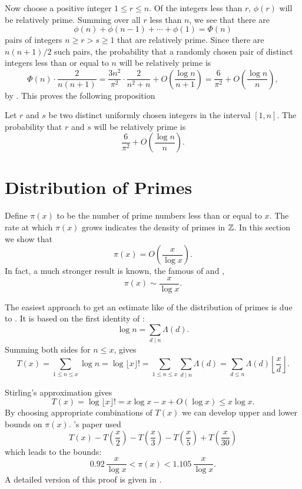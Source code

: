 Now choose a positive integer $1 \le r \le n$.  Of the integers less than
$r$, $\phi(r)$ will be relatively prime.  Summing over all $r$ less
than $n$, we see that there are 
\[
\phi(n) + \phi(n-1) + \cdots + \phi(1) = \Phi(n)
\]
pairs of integers $n \ge r > s \ge 1$ that are relatively prime.  Since
there are $n(n+1)/2$ such pairs, the probability that a randomly chosen
pair of distinct integers less than or equal to $n$ will be relatively
prime is
\[
\Phi(n) \cdot \frac{2}{n(n+1)} 
  = \frac{3 n^2}{\pi^2} \cdot \frac{2}{n^2+n} 
      + O\left(\frac{\log n}{n+1}\right)
  = \frac{6}{\pi^2}+ O\left(\frac{\log n}{n}\right),
\]
by .
This proves the following proposition
\begin{proposition}
\label{RelPrime:Pairs:Prop}
Let $r$ and $s$ be two distinct uniformly chosen integers in the
interval $[1, n]$.  The probability that $r$ and $s$ will be
relatively prime is
\[
\frac{6}{\pi^2}+ O\left(\frac{\log n}{n}\right).
\]
\end{proposition}

\section{Distribution of Primes}
\label{Prime:Dist:Sec}

Define $\pi(x)$ to be the number of prime numbers less than or equal
to $x$.  The
rate at which $\pi(x)$ grows indicates the density of primes in $\mathbb{Z}$.
In this section we show that 
\begin{equation} \label{Prime:Asymp:Eq}
\pi(x) = O\left(\frac{x}{\log x}\right).
\end{equation}
In fact, a much stronger result is known, the famous  of {\Hadamard} and {\ValleePoussin},
\[
\pi(x) \sim \frac{x}{\log x}.
\]

The easiest approach to get an estimate like 
of the distribution of primes is due to {\Chebyshev}.  It is based on
the first identity of :
\[
\log n  = \sum_{d \mid n} \Lambda (d).
\]
Summing both sides for $n \le x$, gives
\[
T(x) = \sum_{1\le n \le x}\log n = \log \lfloor x \rfloor !
= \sum_{1\le n \le x}\sum_{d\mid n} \Lambda(d)
= \sum_{d \le n}\Lambda(d) \left\lfloor\frac{x}{d}\right\rfloor.
\]

Stirling's approximation  gives
\begin{equation} \label{TStirlingApprox:Eq}
T(x) = \log \lfloor
x\rfloor! = x \log x - x + O(\log x) \le x \log x.
\end{equation}
By choosing appropriate combinations of $T(x)$ we can develop upper
and lower bounds on $\pi(x)$.  {\Chebyshev}'s paper used
\[
T(x) - T(\frac{x}{2}) - T(\frac{x}{3}) - T(\frac{x}{5})
 + T(\frac{x}{30})
\]
which leads to the bounds:
\[
0.92 \, \frac{x}{\log x} < \pi(x) < 1.105 \, \frac{x}{\log x}.
\]
A detailed version of this proof is given in {\LandauE}
\cite{Landau1974-cy}.  

